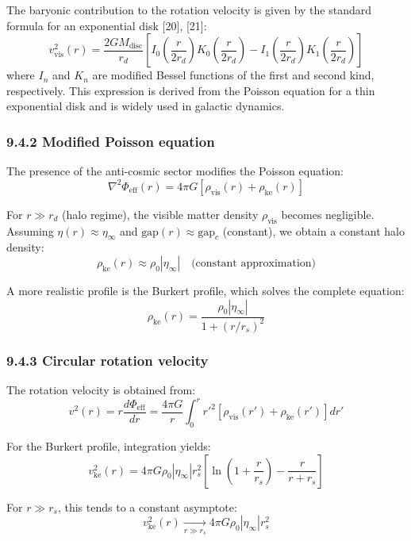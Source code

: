 \documentclass[11pt]{article}
\begin{document}
The baryonic contribution to the rotation velocity is given by the
standard formula for an exponential disk {[}20{]}, {[}21{]}: \[
v_{\text{vis}}^2(r) = \frac{2GM_{\text{disc}}}{r_d} \left[ I_0\left(\frac{r}{2r_d}\right) K_0\left(\frac{r}{2r_d}\right) - I_1\left(\frac{r}{2r_d}\right) K_1\left(\frac{r}{2r_d}\right) \right]
\] where \(I_n\) and \(K_n\) are modified Bessel functions of the first
and second kind, respectively. This expression is derived from the
Poisson equation for a thin exponential disk and is widely used in
galactic dynamics.

\hypertarget{modified-poisson-equation}{%
\subsubsection{9.4.2 Modified Poisson
equation}\label{modified-poisson-equation}}

The presence of the anti-cosmic sector modifies the Poisson equation: \[
\nabla^2 \Phi_{\text{eff}}(r) = 4\pi G \left[ \rho_{\text{vis}}(r) + \rho_{\text{ke}}(r) \right]
\]

For \(r \gg r_d\) (halo regime), the visible matter density
\(\rho_{\text{vis}}\) becomes negligible. Assuming
\(\eta(r) \approx \eta_\infty\) and
\(\text{gap}(r) \approx \text{gap}_c\) (constant), we obtain a constant
halo density: \[
\rho_{\text{ke}}(r) \approx \rho_0 |\eta_\infty| \quad \text{(constant approximation)}
\]

A more realistic profile is the Burkert profile, which solves the
complete equation: \[
\rho_{\text{ke}}(r) = \frac{\rho_0 |\eta_\infty|}{1 + (r/r_s)^2}
\]

\hypertarget{circular-rotation-velocity}{%
\subsubsection{9.4.3 Circular rotation
velocity}\label{circular-rotation-velocity}}

The rotation velocity is obtained from: \[
v^2(r) = r \frac{d\Phi_{\text{eff}}}{dr} = \frac{4\pi G}{r} \int_0^r r'^2 \left[ \rho_{\text{vis}}(r') + \rho_{\text{ke}}(r') \right] dr'
\]

For the Burkert profile, integration yields: \[
v_{\text{ke}}^2(r) = 4\pi G \rho_0 |\eta_\infty| r_s^2 \left[ \ln\left(1 + \frac{r}{r_s}\right) - \frac{r}{r + r_s} \right]
\]

For \(r \gg r_s\), this tends to a constant asymptote: \[
v_{\text{ke}}^2(r) \xrightarrow[r \gg r_s]{} 4\pi G \rho_0 |\eta_\infty| r_s^2
\]
\end{document}
